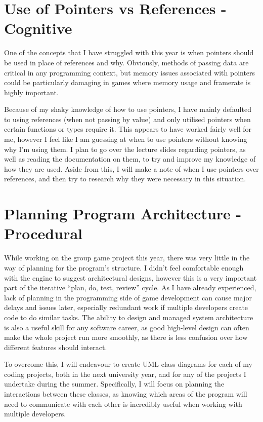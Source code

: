 \documentclass{scrartcl}
\begin{document}
\section{Use of Pointers vs References - Cognitive}

One of the concepts that I have struggled with this year is when pointers should be used in place of references and why. Obviously, methods of passing data are critical in any programming context, but memory issues associated with pointers could be particularly damaging in games where memory usage and framerate is highly important.

Because of my shaky knowledge of how to use pointers, I have mainly defaulted to using references (when not passing by value) and only utilised pointers when certain functions or types require it. This appears to have worked fairly well for me, however I feel like I am guessing at when to use pointers without knowing why I’m using them. I plan to go over the lecture slides regarding pointers, as well as reading the documentation on them, to try and improve my knowledge of how they are used. Aside from this, I will make a note of when I use pointers over references, and then try to research why they were necessary in this situation.



\section{Planning Program Architecture - Procedural}

While working on the group game project this year, there was very little in the way of planning for the program’s structure. I didn’t feel comfortable enough with the engine to suggest architectural designs, however this is a very important part of the iterative “plan, do, test, review” cycle. As I have already experienced, lack of planning in the programming side of game development can cause major delays and issues later, especially redundant work if multiple developers create code to do similar tasks. The ability to design and managed system architecture is also a useful skill for any software career, as good high-level design can often make the whole project run more smoothly, as there is less confusion over how different features should interact.

To overcome this, I will endeavour to create UML class diagrams for each of my coding projects, both in the next university year, and for any of the projects I undertake during the summer. Specifically, I will focus on planning the interactions between these classes, as knowing which areas of the program will need to communicate with each other is incredibly useful when working with multiple developers.
\end{document}
